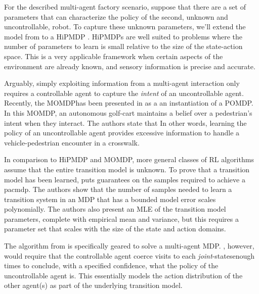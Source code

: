     For the described multi-agent factory scenario, suppose that there are a set of parameters that can characterize the
    policy of the second, unknown and uncontrollable, robot. To capture these unknown parameters, we'll extend the model
    from  to a \ac{HiPMDP}    \cite{doshi2016hidden}. \ac{HiPMDP}s are well suited to problems where the number
    of parameters to learn is small relative to the size of the state-action space. This is a very applicable framework
    when certain aspects of the environment are already known, and sensory information is precise and accurate.

    Arguably, simply exploiting information from a multi-agent interaction only requires a controllable agent to capture
    the \textit{intent} of an uncontrollable agent.  Recently, the \ac{MOMDP}has been presented in
    \cite{bandyopadhyay2013intention} as a an instantiation of a \ac{POMDP}\cite{kaelbling1998planning}. In this
    \ac{MOMDP}, an autonomous golf-cart maintains a belief over a pedestrian's intent when they interact. The authors
    state that  In other words, learning the policy of an uncontrollable agent provides excessive information to handle
    a vehicle-pedestrian encounter in a crosswalk.


    In comparison to \ac{HiPMDP} and \ac{MOMDP}, more general classes of \ac{RL} algorithms assume that the entire
    transition model is unknown. To prove that a transition model has been learned,  \cite{Fu-RSS-14} puts guarantees on
    the samples required to achieve a \ac{pacmdp}. The authors show that the number of samples needed to learn a
    transition system in an \ac{MDP} that has a bounded model error scales polynomially.  The authors also present an
    \ac{MLE} of the transition model parameters, complete with empirical mean and variance, but this requires a
    parameter set that scales with the size of the state and action domains.

    The \Rmax algorithm from \cite{brafman2002r} is specifically geared to solve a multi-agent \ac{MDP}. \Rmax, however,
    would require that the controllable agent coerce visits to each \textit{joint}-states\footnotemark enough times to
    conclude, with a specified confidence, what the policy of the uncontrollable agent is. This essentially models the
    action distribution of the other agent(s) as part of the underlying transition model.  

